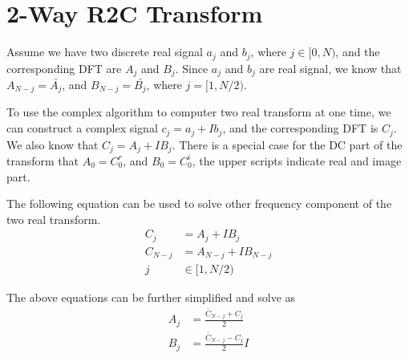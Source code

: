 \documentclass[a4paper,12pt]{article}
\begin{document}
\section{2-Way R2C Transform}
Assume we have two discrete real signal $a_j$ and $b_j$, where $j\in [0,N)$,
and the corresponding DFT are $A_j$ and $B_j$.
Since $a_j$ and $b_j$ are real signal, we know that $A_{N-j}=\bar{A_j}$, 
and $B_{N-j}=\bar{B_j}$, where $j=[1,N/2)$. 
    \par
To use the complex algorithm to computer two real transform at one time, 
we can construct a complex signal $c_j=a_j+Ib_j$, and the corresponding DFT is $C_j$.
We also know that $C_j=A_j+IB_j$.
There is a special case for the DC part of the transform that $A_0=C^r_0$, 
and $B_0=C^i_0$, the upper scripts indicate real and image part.
\par
The following equation can be used to solve other frequency component of
the two real transform.
\begin{align}
    C_j &= A_j+IB_j  \\
    C_{N-j} &= A_{N-j}+IB_{N-j} \\
    j &\in [1, N/2) 
\end{align}
\par
The above equations can be further simplified and solve as
\begin{align}
    A_j &= \frac{\bar{C}_{N-j}+C_j}{2} \\
    B_j &= \frac{\bar{C}_{N-j}-C_j}{2}I 
\end{align}
\end{document}

